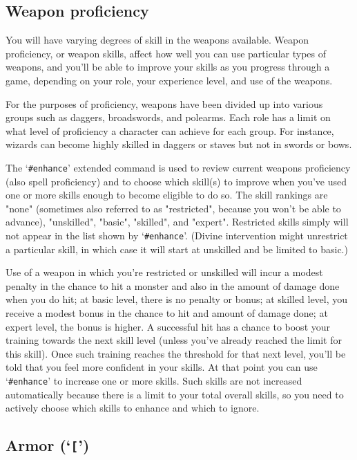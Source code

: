 \subsection*{Weapon proficiency}


You will have varying degrees of skill in the weapons available.
Weapon proficiency, or weapon skills, affect how well you can use
particular types of weapons, and you'll be able to improve your skills
as you progress through a game, depending on your role, your experience
level, and use of the weapons.

For the purposes of proficiency, weapons have
been divided up into various groups such as daggers, broadswords, and
polearms.  Each role has a limit on what level of proficiency a character
can achieve for each group.  For instance, wizards can become highly
skilled in daggers or staves but not in swords or bows.

The `{\tt \#enhance}' extended command is used to review current weapons proficiency
(also spell proficiency) and to choose which skill(s) to improve when
you've used one or more skills enough to become eligible to do so.  The
skill rankings are "none" (sometimes also referred to as "restricted",
because you won't be able to advance), "unskilled", "basic", "skilled",
and "expert".  Restricted skills simply will not appear in the list
shown by `{\tt \#enhance}'.  (Divine intervention might unrestrict a particular
skill, in which case it will start at unskilled and be limited to basic.)

Use of a weapon in which you're restricted or unskilled
will incur a modest penalty in the chance to hit a monster and also in
the amount of damage done when you do hit; at basic level, there is no
penalty or bonus; at skilled level, you receive a modest bonus in the
chance to hit and amount of damage done; at expert level, the bonus is
higher.  A successful hit has a chance to boost your training towards
the next skill level (unless you've already reached the limit for this
skill).  Once such training reaches the threshold for that next level,
you'll be told that you feel more confident in your skills.  At that
point you can use `{\tt \#enhance}' to increase one or more skills.  Such skills
are not increased automatically because there is a limit to your total
overall skills, so you need to actively choose which skills to enhance
and which to ignore.
\subsection*{Armor (`{\tt [}')}

